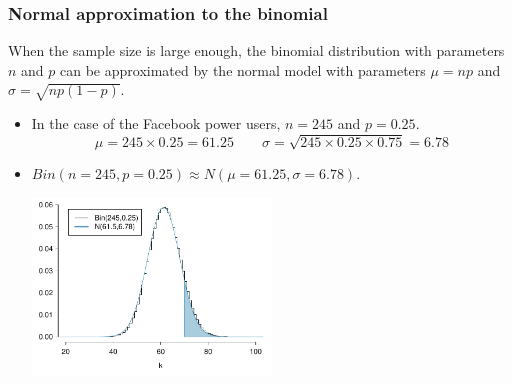 
\begin{frame}
\frametitle{Normal approximation to the binomial}

When the sample size is large enough, the binomial distribution with parameters $n$ and $p$ can be approximated by the normal model with parameters $\mu = np$ and $\sigma = \sqrt{np(1-p)}$.

\begin{itemize}

\item In the case of the Facebook power users, $n = 245$ and $p = 0.25$.
\[ \mu = 245 \times 0.25 = 61.25 \qquad \sigma = \sqrt{245 \times 0.25 \times 0.75} = 6.78 \]

\item $Bin(n = 245, p = 0.25) \approx N(\mu = 61.25, \sigma = 6.78)$.

\begin{center}
\includegraphics[width=0.5\textwidth]{3-4_binomial_distribution/figures/fb_power_user/fb_power_user}
\end{center}

\end{itemize}

\end{frame}


